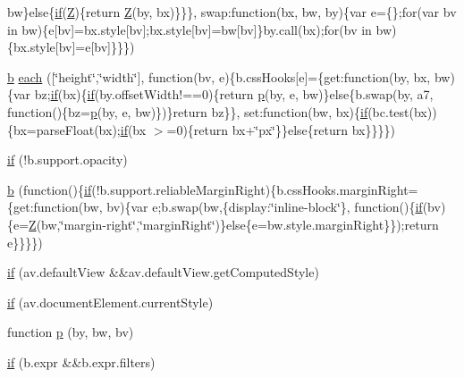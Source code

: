 \begin{DoxyCompactItemize}
bw\}else\{\hyperlink{a00039_a42cbfadee2b4749e8f699ea8d745a0e4}{if}(\hyperlink{a00039_adc18d83abfd9f87d396e8fd6b6ac0fe1}{Z})\{return \hyperlink{a00039_adc18d83abfd9f87d396e8fd6b6ac0fe1}{Z}(by, bx)\}\}\}, swap\+:function(bx, bw, by)\{var e=\{\};for(var bv in bw)\{e\mbox{[}bv\mbox{]}=bx.\+style\mbox{[}bv\mbox{]};bx.\+style\mbox{[}bv\mbox{]}=bw\mbox{[}bv\mbox{]}\}by.\+call(bx);for(bv in bw)\{bx.\+style\mbox{[}bv\mbox{]}=e\mbox{[}bv\mbox{]}\}\}\})
\item 
\hyperlink{a00039_a2fa551895933fae935a0a6b87282241d}{b} \hyperlink{a00039_a871ff39db627c54c710a3e9909b8234c}{each} (\mbox{[}\char`\"{}height\char`\"{},\char`\"{}width\char`\"{}\mbox{]}, function(bv, e)\{b.\+css\+Hooks\mbox{[}e\mbox{]}=\{get\+:function(by, bx, bw)\{var bz;\hyperlink{a00039_a42cbfadee2b4749e8f699ea8d745a0e4}{if}(bx)\{\hyperlink{a00039_a42cbfadee2b4749e8f699ea8d745a0e4}{if}(by.\+offset\+Width!==0)\{return \hyperlink{a00039_a2335e57f79b6acfb6de59c235dc8a83e}{p}(by, e, bw)\}else\{b.\+swap(by, a7, function()\{bz=\hyperlink{a00039_a2335e57f79b6acfb6de59c235dc8a83e}{p}(by, e, bw)\})\}return bz\}\}, set\+:function(bw, bx)\{\hyperlink{a00039_a42cbfadee2b4749e8f699ea8d745a0e4}{if}(bc.\+test(bx))\{bx=parse\+Float(bx);\hyperlink{a00039_a42cbfadee2b4749e8f699ea8d745a0e4}{if}(bx $>$=0)\{return bx+\char`\"{}px\char`\"{}\}\}else\{return bx\}\}\}\})
\item 
\hyperlink{a00039_a9db6d45a025ad692282fe23e69eeba43}{if} (!b.\+support.\+opacity)
\item 
\hyperlink{a00039_a2fa551895933fae935a0a6b87282241d}{b} (function()\{\hyperlink{a00039_a42cbfadee2b4749e8f699ea8d745a0e4}{if}(!b.\+support.\+reliable\+Margin\+Right)\{b.\+css\+Hooks.\+margin\+Right=\{get\+:function(bw, bv)\{var e;b.\+swap(bw,\{display\+:\char`\"{}inline-\/block\char`\"{}\}, function()\{\hyperlink{a00039_a42cbfadee2b4749e8f699ea8d745a0e4}{if}(bv)\{e=\hyperlink{a00039_adc18d83abfd9f87d396e8fd6b6ac0fe1}{Z}(bw,\char`\"{}margin-\/right\char`\"{},\char`\"{}margin\+Right\char`\"{})\}else\{e=bw.\+style.\+margin\+Right\}\});return e\}\}\}\})
\item 
\hyperlink{a00039_a30d3d2cd5b567c9f31b2aa30b9cb3bb8}{if} (av.\+default\+View \&\&av.\+default\+View.\+get\+Computed\+Style)
\item 
\hyperlink{a00039_a2c54bd8ed7482e89d19331ba61fe221c}{if} (av.\+document\+Element.\+current\+Style)
\item 
function \hyperlink{a00039_a2335e57f79b6acfb6de59c235dc8a83e}{p} (by, bw, bv)
\item 
\hyperlink{a00039_a42cbfadee2b4749e8f699ea8d745a0e4}{if} (b.\+expr \&\&b.\+expr.\+filters)
\end{DoxyCompactItemize}
